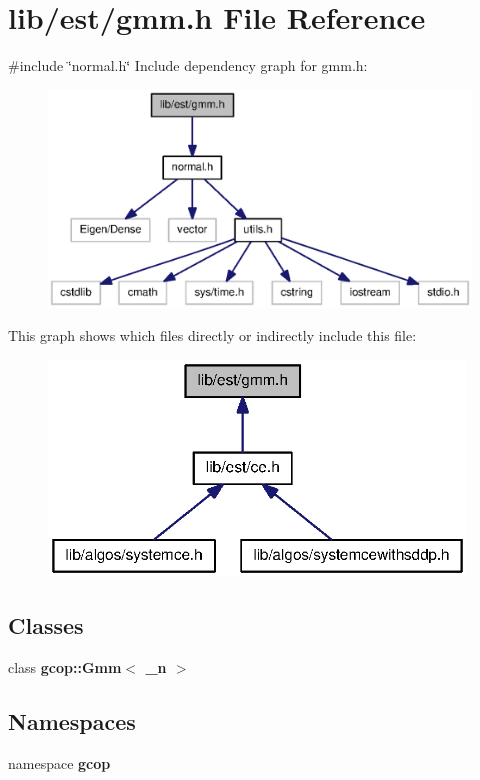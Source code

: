 \section{lib/est/gmm.h \-File \-Reference}
\label{gmm_8h}
{\ttfamily \#include \char`\"{}normal.\-h\char`\"{}}\*
\-Include dependency graph for gmm.\-h\-:\nopagebreak
\begin{figure}[H]
\begin{center}
\leavevmode
\includegraphics[width=350pt]{gmm_8h__incl}
\end{center}
\end{figure}
\-This graph shows which files directly or indirectly include this file\-:\nopagebreak
\begin{figure}[H]
\begin{center}
\leavevmode
\includegraphics[width=314pt]{gmm_8h__dep__incl}
\end{center}
\end{figure}
\subsection*{\-Classes}
\begin{DoxyCompactItemize}
\item 
class {\bf gcop\-::\-Gmm$<$ \-\_\-n $>$}
\end{DoxyCompactItemize}
\subsection*{\-Namespaces}
\begin{DoxyCompactItemize}
\item 
namespace {\bf gcop}
\end{DoxyCompactItemize}
